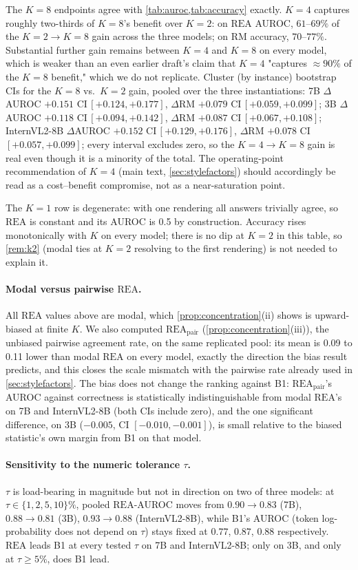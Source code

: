 \documentclass[11pt]{article}
\newcommand{\rea}{\mathrm{REA}}
\newcommand{\rmg}{\mathrm{RM}}
\begin{document}
\noindent The $K{=}8$ endpoints agree with \cref{tab:auroc,tab:accuracy} exactly. $K{=}4$ captures roughly two-thirds of $K{=}8$'s benefit over $K{=}2$: on $\rea$ AUROC, $61$--$69\%$ of the $K{=}2\to K{=}8$ gain across the three models; on $\rmg$ accuracy, $70$--$77\%$. Substantial further gain remains between $K{=}4$ and $K{=}8$ on every model, which is weaker than an even earlier draft's claim that $K{=}4$ "captures ${\approx}90\%$ of the $K{=}8$ benefit," which we do not replicate. Cluster (by instance) bootstrap CIs for the $K{=}8$ vs.\ $K{=}2$ gain, pooled over the three instantiations: 7B $\Delta$AUROC $+0.151$ CI\,$[+0.124,+0.177]$, $\Delta\rmg$ $+0.079$ CI\,$[+0.059,+0.099]$; 3B $\Delta$AUROC $+0.118$ CI\,$[+0.094,+0.142]$, $\Delta\rmg$ $+0.087$ CI\,$[+0.067,+0.108]$; InternVL2-8B $\Delta$AUROC $+0.152$ CI\,$[+0.129,+0.176]$, $\Delta\rmg$ $+0.078$ CI\,$[+0.057,+0.099]$; every interval excludes zero, so the $K{=}4\to K{=}8$ gain is real even though it is a minority of the total. The operating-point recommendation of $K{=}4$ (main text, \cref{sec:stylefactors}) should accordingly be read as a cost--benefit compromise, not as a near-saturation point.

The $K{=}1$ row is degenerate: with one rendering all answers trivially agree, so $\rea$ is constant and its AUROC is 0.5 by construction. Accuracy rises monotonically with $K$ on every model; there is no dip at $K{=}2$ in this table, so \cref{rem:k2} (modal ties at $K{=}2$ resolving to the first rendering) is not needed to explain it.

\paragraph{Modal versus pairwise $\rea$.} All $\rea$ values above are modal, which \cref{prop:concentration}(ii) shows is upward-biased at finite $K$. We also computed $\rea_{\text{pair}}$ (\cref{prop:concentration}(iii)), the unbiased pairwise agreement rate, on the same replicated pool: its mean is 0.09 to 0.11 lower than modal $\rea$ on every model, exactly the direction the bias result predicts, and this closes the scale mismatch with the pairwise rate already used in \cref{sec:stylefactors}. The bias does not change the ranking against B1: $\rea_{\text{pair}}$'s AUROC against correctness is statistically indistinguishable from modal $\rea$'s on 7B and InternVL2-8B (both CIs include zero), and the one significant difference, on 3B ($-0.005$, CI $[-0.010,-0.001]$), is small relative to the biased statistic's own margin from B1 on that model.

\paragraph{Sensitivity to the numeric tolerance $\tau$.} $\tau$ is load-bearing in magnitude but not in direction on two of three models: at $\tau \in \{1,2,5,10\}\%$, pooled $\rea$-AUROC moves from $0.90 \to 0.83$ (7B), $0.88 \to 0.81$ (3B), $0.93 \to 0.88$ (InternVL2-8B), while B1's AUROC (token log-probability does not depend on $\tau$) stays fixed at $0.77$, $0.87$, $0.88$ respectively. $\rea$ leads B1 at every tested $\tau$ on 7B and InternVL2-8B; only on 3B, and only at $\tau{\ge}5\%$, does B1 lead.

\FloatBarrier
\end{document}
